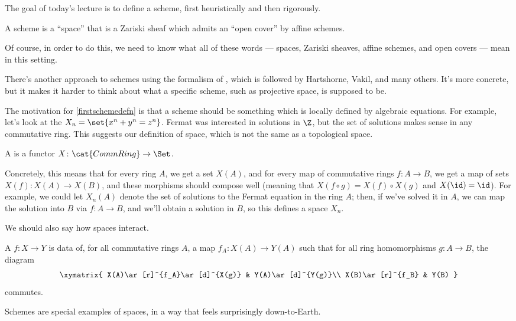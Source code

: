 The goal of today's lecture is to define a scheme, first heuristically and then rigorously.
\begin{quotdefn}
\label{firstschemedefn}
A scheme is a ``space'' that is a Zariski sheaf which admits an ``open cover'' by affine schemes.
\end{quotdefn}
Of course, in order to do this, we need to know what all of these words --- spaces, Zariski sheaves, affine
schemes, and open covers --- mean in this setting.
\begin{rem}
There's another approach to schemes using the formalism of , which is followed by
Hartshorne, Vakil, and many others. It's more concrete, but it makes it harder to think about what a specific
scheme, such as projective space, is supposed to be.
\end{rem}
The motivation for \cref{firstschemedefn} is that a scheme should be something which is locally defined by
algebraic equations. For example, let's look at the  $X_n = \set{x^n+y^n = z^n}$. Fermat was
interested in solutions in $\Z$, but the set of solutions makes sense in any commutative ring. This suggests our
definition of space, which is not the same as a topological space.
\begin{defn}
A  is a functor $X\colon\cat{CommRing}\to\Set$.
\end{defn}
Concretely, this means that for every ring $A$, we get a set $X(A)$, and for every map of commutative rings
$f\colon A\to B$, we get a map of sets $X(f)\colon X(A)\to X(B)$, and these morphisms should compose well (meaning
that $X(f\circ g) = X(f)\circ X(g)$ and $X(\id) = \id$). For example, we could let $X_n(A)$ denote the set of
solutions to the Fermat equation in the ring $A$; then, if we've solved it in $A$, we can map the solution into $B$
via $f\colon A\to B$, and we'll obtain a solution in $B$, so this defines a space $X_n$.

We should also say how spaces interact.
\begin{defn}
A  $f\colon X\to Y$ is data of, for all commutative rings $A$, a map $f_A\colon X(A)\to
Y(A)$ such that for all ring homomorphisms $g\colon A\to B$, the diagram
\[\xymatrix{
	X(A)\ar[r]^{f_A}\ar[d]^{X(g)} & Y(A)\ar[d]^{Y(g)}\\
	X(B)\ar[r]^{f_B} & Y(B)
}\]
commutes.
\end{defn}
Schemes are special examples of spaces, in a way that feels surprisingly down-to-Earth.

